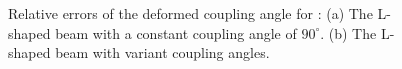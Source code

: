 \documentclass[preprint,12pt]{elsarticle}
\theoremstyle{remark}
\begin{document}
\begin{figure}[!hbt]
\begin{subfigure}[b]{.49\textwidth}
        \caption{}\label{fig:L-beam-angle-error1}
    \end{subfigure}
	\caption{Relative errors of the deformed coupling angle for : (a) The L-shaped beam with a constant coupling angle of $90^\circ$. (b) The L-shaped beam with variant coupling angles.}\label{fig:L-beam-angle}
\end{figure}
\clearpage


\end{document}
